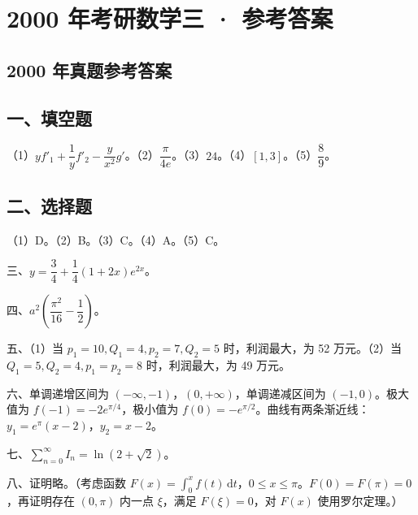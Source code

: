 \documentclass[UTF8,12pt]{ctexart}
\begin{document}
\section*{2000 年考研数学三 · 参考答案}
\subsection*{2000 年真题参考答案}

\subsection*{一、填空题}

（1）\(\displaystyle yf'_1+\dfrac{\displaystyle 1}{\displaystyle y} f'_2-\dfrac{\displaystyle y}{\displaystyle x^2}g'\)。（2）\(\displaystyle \dfrac{\displaystyle \pi}{\displaystyle 4e}\)。（3）\(\displaystyle 24\)。（4）\(\displaystyle [1,\allowbreak 3]\)。（5）\(\displaystyle \dfrac{\displaystyle 8}{\displaystyle 9}\)。


\subsection*{二、选择题}

（1）D。（2）B。（3）C。（4）A。（5）C。


三、\(\displaystyle y=\dfrac{\displaystyle 3}{\displaystyle 4}+\dfrac{\displaystyle 1}{\displaystyle 4}(1+2x)e^{2x}\)。


四、\(\displaystyle a^2\left(\dfrac{\displaystyle \pi^2}{\displaystyle 16}-\dfrac{\displaystyle 1}{\displaystyle 2}\right)\)。


五、（1）当 \(\displaystyle p_1=10,\allowbreak Q_1=4,\allowbreak p_2=7,\allowbreak Q_2=5\) 时，利润最大，为 52 万元。（2）当 \(\displaystyle Q_1=5,\allowbreak Q_2=4,\allowbreak p_1=p_2=8\) 时，利润最大，为 49 万元。


六、单调递增区间为 \(\displaystyle ( -\infty,\allowbreak -1 )\)，\(\displaystyle (0,\allowbreak +\infty)\)，单调递减区间为 \(\displaystyle (-1,\allowbreak 0)\)。极大值为 \(\displaystyle f(-1)=-2e^{\pi/4}\)，极小值为 \(\displaystyle f(0)=-e^{\pi/2}\)。曲线有两条渐近线：\(\displaystyle y_1=e^\pi(x-2)\)，\(\displaystyle y_2=x-2\)。


七、\(\displaystyle \sum_{n=0}^{\infty}I_n=\ln(2+\sqrt2)\)。


八、证明略。（考虑函数 \(\displaystyle F(x)=\displaystyle \int_0^x f(t)\,\mathrm dt\)，\(\displaystyle 0\le x\le\pi\)。\(\displaystyle F(0)=F(\pi)=0\)，再证明存在 \(\displaystyle (0,\allowbreak \pi)\) 内一点 \(\displaystyle \xi\)，满足 \(\displaystyle F(\xi)=0\)，对 \(\displaystyle F(x)\) 使用罗尔定理。）
\end{document}
